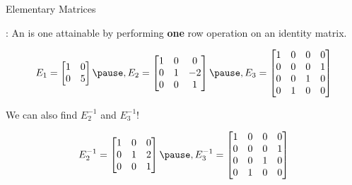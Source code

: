 \documentclass[xcoler=dvipsnames, aspectratio=169]{beamer}
\begin{document}
    \begin{frame}{Elementary Matrices}
        \scriptsize
        \begin{defn}
            : An  is one attainable by performing
            \textbf{one} row operation on an identity matrix.
        \end{defn}
        \pause
        \begin{example}
            \[
                E_1 = \begin{bmatrix}1&0\\0&5\end{bmatrix}\pause, E_2 = \begin{bmatrix}1&0&0\\0&1&-2\\0&0&1\end{bmatrix}
                \pause, E_3 = \begin{bmatrix}
                    1&0&0&0\\
                    0&0&0&1\\
                    0&0&1&0\\
                    0&1&0&0
                \end{bmatrix}
            \]
        \end{example}
        We can also find $E^{-1}_2$ and $E^{-1}_3$!
        \pause
        \begin{example}
            \[
                E^{-1}_2 = \begin{bmatrix}1&0&0\\0&1&2\\0&0&1\end{bmatrix}
                    \pause, E^{-1}_3 = \begin{bmatrix}
                    1&0&0&0\\
                    0&0&0&1\\
                    0&0&1&0\\
                    0&1&0&0
                \end{bmatrix}
            \]
        \end{example}
    \end{frame}
\end{document}
